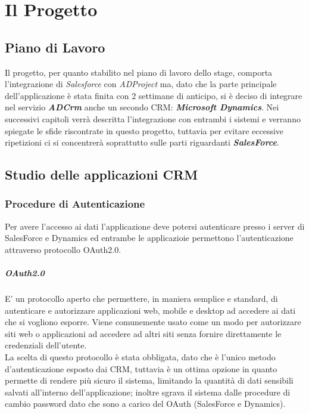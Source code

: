 \documentclass[12pt,a4paper,twoside,openright,english]{book}
\begin{document}
\chapter{Il Progetto}\label{introduzione}
	\section{Piano di Lavoro}
		Il progetto, per quanto stabilito nel piano di lavoro dello stage, comporta l'integrazione di \textit{Salesforce} con \textit{ADProject} ma, dato che la parte principale dell'applicazione è stata finita con 2 settimane di anticipo, si è deciso di integrare nel servizio \textit{\textbf{ADCrm}} anche un secondo CRM: \textit{\textbf{Microsoft Dynamics}}.
		Nei successivi capitoli verrà descritta l'integrazione con entrambi i sistemi e verranno spiegate le sfide riscontrate in questo progetto, tuttavia per evitare eccessive ripetizioni ci si concentrerà soprattutto sulle parti riguardanti \textit{\textbf{SalesForce}}.
	\section{Studio delle applicazioni CRM}
		\subsection{Procedure di Autenticazione}
			Per avere l'accesso ai dati l'applicazione deve potersi autenticare presso i server di SalesForce e Dynamics ed entrambe le applicazioie permettono l'autenticazione attraverso protocollo OAuth2.0.
			\paragraph{OAuth2.0}
			E' un protocollo aperto che permettere, in maniera semplice e standard, di autenticare e autorizzare applicazioni web, mobile e desktop ad accedere ai dati che si vogliono esporre. Viene comunemente usato come un modo per autorizzare siti web o applicazioni ad accedere ad altri siti senza fornire direttamente le credenziali dell'utente.\\
			La scelta di questo protocollo è stata obbligata, dato che è l'unico metodo d'autenticazione esposto dai CRM, tuttavia è un ottima opzione in quanto permette di rendere più sicuro il sistema, limitando la quantità di dati sensibili salvati all'interno dell'applicazione; inoltre sgrava il sistema dalle procedure di cambio password dato che sono a carico del  OAuth (SalesForce e Dynamics).
\end{document}
